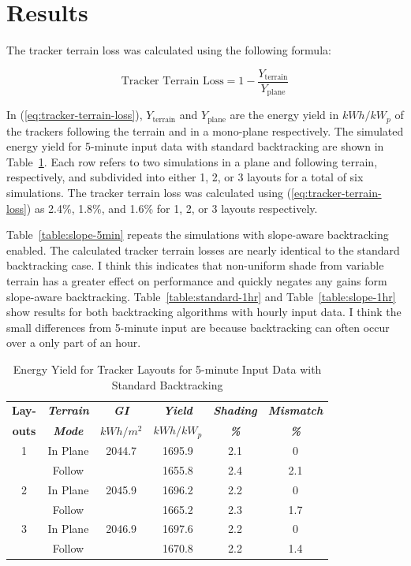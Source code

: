 \documentclass[conference]{IEEEtran}
\begin{document}
\section{Results}

The tracker terrain loss was calculated using the following formula:

\begin{equation}
\text{Tracker Terrain Loss} = 1 - \frac{Y_\text{terrain}}{Y_\text{plane}}\label{eq:tracker-terrain-loss}
\end{equation}

In (\ref{eq:tracker-terrain-loss}), $Y_\text{terrain}$ and $Y_\text{plane}$ are the energy yield in $kWh/kW_p$ of the trackers following the terrain and in a mono-plane respectively. The simulated energy yield for 5-minute input data with standard backtracking are shown in Table~\ref{table:standard-5min}. Each row refers to two simulations in a plane and following terrain, respectively, and subdivided into either 1, 2, or 3 layouts for a total of six simulations. The tracker terrain loss was calculated using (\ref{eq:tracker-terrain-loss}) as 2.4\%, 1.8\%, and 1.6\% for 1, 2, or 3 layouts respectively.

Table~\ref{table:slope-5min} repeats the simulations with slope-aware backtracking enabled. The calculated tracker terrain losses are nearly identical to the standard backtracking case. I think this indicates that non-uniform shade from variable terrain has a greater effect on performance and quickly negates any gains form slope-aware backtracking. Table~\ref{table:standard-1hr} and Table~\ref{table:slope-1hr} show results for both backtracking algorithms with hourly input data. I think the small differences from 5-minute input are because backtracking can often occur over a only part of an hour.

\begin{table}[htbp]
\caption{Energy Yield for Tracker Layouts for 5-minute Input Data with Standard Backtracking}
\begin{center}
\begin{tabular}{|c|c|c|c|c|c|}
\hline
\textbf{Lay-}& \textbf{\textit{Terrain}}& \textbf{\textit{GI}}&        \textbf{\textit{Yield}}&        \textbf{\textit{Shading}}& \textbf{\textit{Mismatch}} \\
\textbf{outs}& \textbf{\textit{Mode}}&    \textbf{\textit{$kWh/m^2$}}& \textbf{\textit{$kWh / kW_p$}}& \textbf{\textit{\%}}&      \textbf{\textit{\%}} \\
\hline
1& In Plane& 2044.7&  1695.9& 2.1& 0 \\
 & Follow&         &  1655.8& 2.4& 2.1 \\
\hline
2& In Plane& 2045.9&  1696.2& 2.2& 0 \\
 & Follow&         &  1665.2& 2.3& 1.7 \\
\hline
3& In Plane& 2046.9&  1697.6& 2.2& 0 \\
 & Follow&         &  1670.8& 2.2& 1.4 \\
\hline
\end{tabular}
\label{table:standard-5min}
\end{center}
\end{table}
\end{document}
